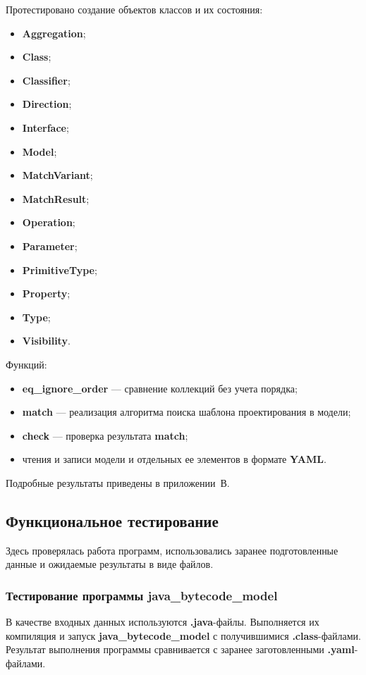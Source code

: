 Протестировано создание объектов классов и их состояния:
\begin{itemize}
\item \textbf{Aggregation};
\item \textbf{Class};
\item \textbf{Classifier};
\item \textbf{Direction};
\item \textbf{Interface};
\item \textbf{Model};
\item \textbf{MatchVariant};
\item \textbf{MatchResult};
\item \textbf{Operation};
\item \textbf{Parameter};
\item \textbf{PrimitiveType};
\item \textbf{Property};
\item \textbf{Type};
\item \textbf{Visibility}.
\end{itemize}

Функций:
\begin{itemize}
\item \textbf{eq\_ignore\_order} --- сравнение коллекций без учета порядка;
\item \textbf{match} --- реализация алгоритма поиска шаблона проектирования в модели;
\item \textbf{check} --- проверка результата \textbf{match};
\item чтения и записи модели и отдельных ее элементов в формате \textbf{YAML}.
\end{itemize}

Подробные результаты приведены в приложении~В.

\subsection{Функциональное тестирование}

Здесь проверялась работа программ, использовались заранее подготовленные данные
и ожидаемые результаты в виде файлов.

\subsubsection{Тестирование программы java\_bytecode\_model}

В качестве входных данных используются \textbf{.java}-файлы.
Выполняется их компиляция и запуск \textbf{java\_bytecode\_model} с
получившимися \textbf{.class}-файлами.
Результат выполнения программы сравнивается с заранее заготовленными
\textbf{.yaml}-файлами.

